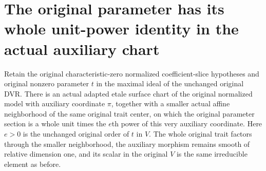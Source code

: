 \section{The original parameter has its whole unit-power identity in the actual auxiliary chart}
\begin{theorem}\label{thm:original-auxiliary-whole-unit-chart}
Retain the original characteristic-zero normalized coefficient-slice hypotheses and original nonzero parameter $t$ in the maximal ideal of the unchanged original DVR. There is an actual adapted etale surface chart of the original normalized model with auxiliary coordinate $\pi$, together with a smaller actual affine neighborhood of the same original trait center, on which the original parameter section is a whole unit times the $e$th power of this very auxiliary coordinate. Here $e>0$ is the unchanged original order of $t$ in $V$. The whole original trait factors through the smaller neighborhood, the auxiliary morphism remains smooth of relative dimension one, and its scalar in the original $V$ is the same irreducible element as before.
\leanok
\end{theorem}
